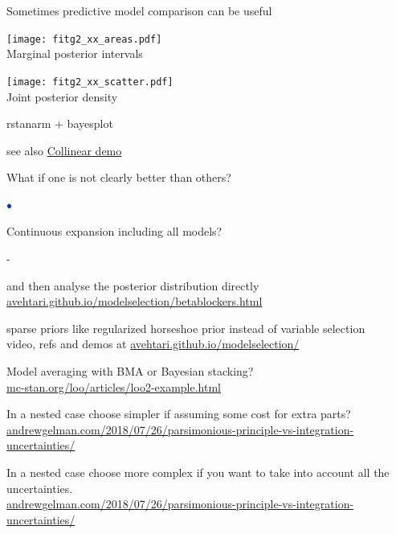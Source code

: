 \documentclass[english,t]{beamer}
\newenvironment{list1}{
   \begin{list}{$\color{list1}\bullet$}{\itemsep=6pt}}{
  \end{list}}
\newenvironment{list2}{
  \begin{list}{-}{\baselineskip=12pt\itemsep=2pt}}{
  \end{list}}
\begin{document}
\begin{frame}{Sometimes predictive model comparison can be useful}

      \begin{minipage}[t]{0.45\linewidth}
        \begin{center}
          \texttt{[image: fitg2\_xx\_areas.pdf]}\\
          Marginal posterior intervals
        \end{center} 
      \end{minipage}
      \pause
      \begin{minipage}[t]{0.45\linewidth}
        \begin{center}
          \texttt{[image: fitg2\_xx\_scatter.pdf]}\\
          Joint posterior density
        \end{center} 
      \end{minipage}

            \begin{center}
      {\scriptsize rstanarm + bayesplot}
    \end{center}

    \pause
    {\small
      see also \href{https://avehtari.github.io/modelselection/collinear.html}{Collinear demo}
    }

\end{frame}

\begin{frame}{ What if one is not clearly better than others?}

  \begin{list1}
  \item<2-> Continuous expansion including all models?
    \begin{list2}
    \item and then analyse the posterior distribution directly\\
        {\small \url{avehtari.github.io/modelselection/betablockers.html}}
      \item sparse priors like regularized horseshoe prior instead of variable selection\\
        {\small video, refs and demos at
          \url{avehtari.github.io/modelselection/}}
    \end{list2}
  \item<3-> Model averaging with BMA or Bayesian stacking?\\
    {\small \url{mc-stan.org/loo/articles/loo2-example.html}}
  \item<4-> In a nested case choose simpler if assuming some cost for
    extra parts?\\
    {\small \url{andrewgelman.com/2018/07/26/parsimonious-principle-vs-integration-uncertainties/}}
  \item<5-> In a nested case choose more complex if you want to take
    into account all the uncertainties.\\
    {\small \url{andrewgelman.com/2018/07/26/parsimonious-principle-vs-integration-uncertainties/}}
  \end{list1}

\end{frame}
\end{document}
